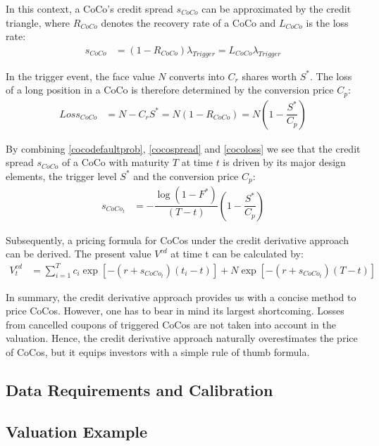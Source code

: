 In this context, a CoCo's credit spread $s_{CoCo}$ can be approximated by the credit triangle, where $R_{CoCo}$ denotes the recovery rate of a CoCo and $L_{CoCo}$ is the loss rate:
\begin{align} \label{cocospread}
    s_{CoCo} &= \left(1 - R_{CoCo}\right) \lambda_{Trigger} = {L}_{CoCo} \lambda_{Trigger}
\end{align}

In the trigger event, the face value $N$ converts into $C_r$ shares worth $S^*$. The loss of a long position in a CoCo is therefore determined by the conversion price $C_p$:
\begin{align} \label{cocoloss}
    {Loss}_{CoCo} &= N - C_r S^* = N \left(1 - R_{CoCo} \right) = N \left(1 - \dfrac{S^*}{C_p} \right)
\end{align} 

By combining \ref{cocodefaultprob}, \ref{cocospread} and \ref{cocoloss} we see that the credit spread $s_{CoCo}$ of a CoCo with maturity $T$ at time $t$ is driven by its major design elements, the trigger level $S^*$ and the conversion price $C_p$:
\begin{align}
s_{CoCo_t}&= - \dfrac{\log (1 - F^*)}{(T - t)} \left( 1 - \dfrac{S^*}{C_p} \right)
\end{align}

Subsequently, a pricing formula for CoCos under the credit derivative approach can be derived. The present value $V^{cd}$ at time t can be calculated by:
\begin{align}
V^{cd}_t &= \sum^T_{i=1} c_i \exp\left[-(r + s_{CoCo_t}) (t_i - t)\right] + N \exp\left[-(r+s_{CoCo_t}) (T-t) \right]
\end{align}

In summary, the credit derivative approach provides us with a concise method to price CoCos. However, one has to bear in mind its largest shortcoming. Losses from cancelled coupons of triggered CoCos are not taken into account in the valuation. Hence, the credit derivative approach naturally overestimates the price of CoCos, but it equips investors with a simple rule of thumb formula. 

\subsection{Data Requirements and Calibration}

\subsection{Valuation Example}

